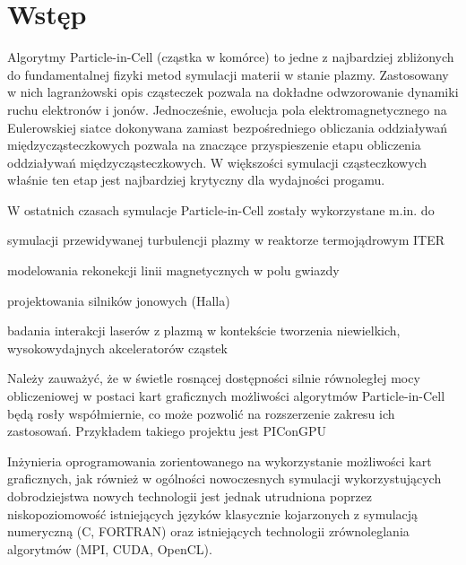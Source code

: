 \newcommand{\code}[1]{\texttt{#1}}

\section[Wstęp]{Wstęp} %
Algorytmy Particle-in-Cell (cząstka w komórce) to jedne z najbardziej zbliżonych do fundamentalnej fizyki
metod symulacji materii w stanie plazmy. Zastosowany w nich lagranżowski opis cząsteczek pozwala na dokładne
odwzorowanie dynamiki ruchu elektronów i jonów. Jednocześnie, ewolucja pola elektromagnetycznego na Eulerowskiej
siatce dokonywana zamiast bezpośredniego obliczania oddziaływań międzycząsteczkowych pozwala na znaczące
przyspieszenie etapu obliczenia oddziaływań międzycząsteczkowych. W większości symulacji cząsteczkowych właśnie
ten etap jest najbardziej krytyczny dla wydajności progamu.

W ostatnich czasach symulacje Particle-in-Cell zostały wykorzystane m.in. do
\item symulacji przewidywanej turbulencji plazmy w reaktorze termojądrowym ITER %
\item modelowania rekonekcji linii magnetycznych w polu gwiazdy %
\item projektowania silników jonowych (Halla) %
\item badania interakcji laserów z plazmą w kontekście tworzenia niewielkich,
    wysokowydajnych akceleratorów cząstek %

    Należy zauważyć, że w świetle rosnącej dostępności silnie równoległej mocy obliczeniowej w postaci kart graficznych
    możliwości algorytmów Particle-in-Cell będą rosły współmiernie, co może pozwolić na rozszerzenie zakresu ich zastosowań.
    Przykładem takiego projektu jest PIConGPU %

    Inżynieria oprogramowania zorientowanego na wykorzystanie możliwości kart graficznych,
    jak również w ogólności nowoczesnych symulacji wykorzystujących dobrodziejstwa nowych technologii
    jest jednak utrudniona poprzez niskopoziomowość istniejących języków klasycznie
    kojarzonych z symulacją numeryczną (C, FORTRAN) oraz istniejących technologii zrównoleglania
    algorytmów (MPI, CUDA, OpenCL).

